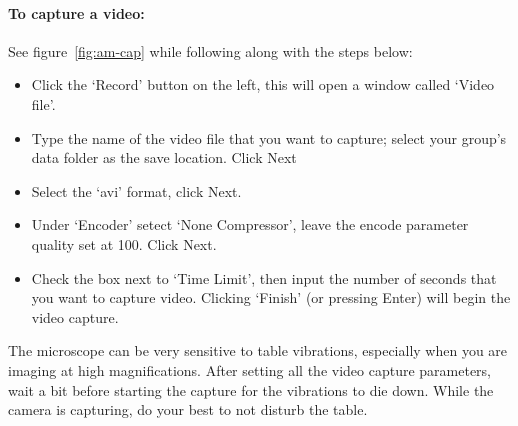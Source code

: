 \paragraph*{To capture a video:}
See figure~\ref{fig:am-cap} while following along with the steps below:
\begin{itemize}
\itemsep-0.3em
\item Click the `Record' button on the left, this will open a window called `Video file'.
\item Type the name of the video file that you want to capture; select your group's data folder as the save location. Click Next
\item Select the `avi' format, click Next.
\item Under `Encoder' setect `None Compressor', leave the encode parameter quality set at 100. Click Next.
\item Check the box next to `Time Limit', then input the number of seconds that you want to capture video. Clicking `Finish' (or pressing Enter) will begin the video capture.
\end{itemize}
The microscope can be very sensitive to table vibrations, especially when you are imaging at high magnifications. 
After setting all the video capture parameters, wait a bit before starting the capture for the vibrations to die down.
While the camera is capturing, do your best to not disturb the table.

